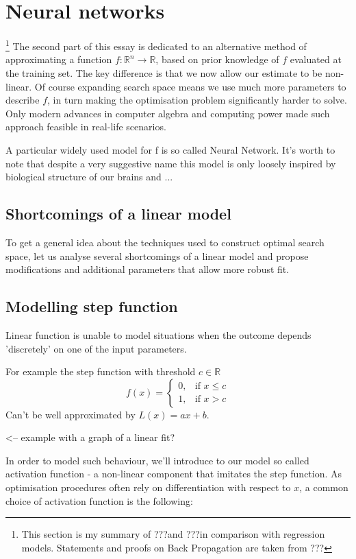 \documentclass[a4paper]{article}
\theoremstyle{break}
\newcommand{\bib}{???}
\newcommand{\R}{\mathbb{R}}
\begin{document}
\pagebreak

\section{Neural networks}

\footnote{This section is my summary of \bib and \bib in comparison with regression models. Statements and proofs on Back Propagation are taken from \bib}
%
The second part of this essay is dedicated to an alternative method of approximating a function $ f : \R^n \to \R$, based on prior knowledge of $f$ evaluated at the training set. The key difference is that we now allow our estimate to be non-linear. Of course expanding search space means we use much more parameters to describe $f$, in turn making the optimisation problem significantly harder to solve. Only modern advances in computer algebra and computing power made such approach feasible in real-life scenarios.

A particular widely used model for f is so called Neural Network. It's worth to note that despite a very suggestive name this model is only loosely inspired by biological structure of our brains and ...

\subsection{Shortcomings of a linear model}
To get a general idea about the techniques used to construct optimal search space, let us analyse several shortcomings of a linear model and propose modifications and additional parameters that allow more robust fit.

\subsection{Modelling step function}
Linear function is unable to model situations when the outcome depends 'discretely' on one of the input parameters.

For example the step function with threshold $c \in \R$
$$ f(x) =
\begin{cases}
    0,& \text{if } x\leq c\\
    1,& \text{if } x > c
\end{cases}$$
Can't be well approximated by $L(x) = a x  + b$.

<-- example with a graph of a linear fit?

In order to model such behaviour, we'll introduce to our model so called activation function - a non-linear component  that imitates the step function. As optimisation procedures often rely on differentiation with respect to $x$, a common choice of activation function is the following:
\end{document}
